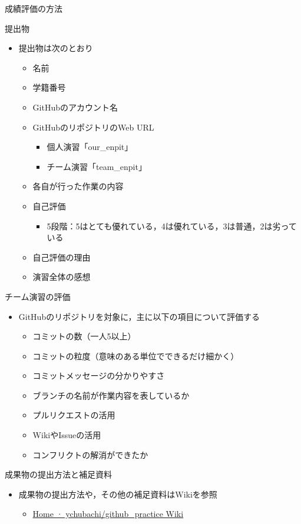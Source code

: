 \documentclass[a4paper,twoside,twocolumn]{beamer}
\begin{document}
\begin{frame}[label=sec-5]{成績評価の方法}
\begin{block}{提出物}
\begin{itemize}
\item 提出物は次のとおり
\begin{itemize}
\item 名前
\item 学籍番号
\item GitHubのアカウント名
\item GitHubのリポジトリのWeb URL
\begin{itemize}
\item 個人演習「our\_enpit」
\item チーム演習「team\_enpit」
\end{itemize}
\item 各自が行った作業の内容
\item 自己評価
\begin{itemize}
\item 5段階：5はとても優れている，4は優れている，3は普通，2は劣っている
\end{itemize}
\item 自己評価の理由
\item 演習全体の感想
\end{itemize}
\end{itemize}
\end{block}

\begin{block}{チーム演習の評価}
\begin{itemize}
\item GitHubのリポジトリを対象に，主に以下の項目について評価する
\begin{itemize}
\item コミットの数（一人5以上）
\item コミットの粒度（意味のある単位でできるだけ細かく）
\item コミットメッセージの分かりやすさ
\item ブランチの名前が作業内容を表しているか
\item プルリクエストの活用
\item WikiやIssueの活用
\item コンフリクトの解消ができたか
\end{itemize}
\end{itemize}
\end{block}

\begin{block}{成果物の提出方法と補足資料}
\begin{itemize}
\item 成果物の提出方法や，その他の補足資料はWikiを参照
\begin{itemize}
\item \href{https://github.com/ychubachi/github_practice/wiki}{Home · ychubachi/github\_practice Wiki}
\end{itemize}
\end{itemize}
\end{block}
\end{frame}
\end{document}

